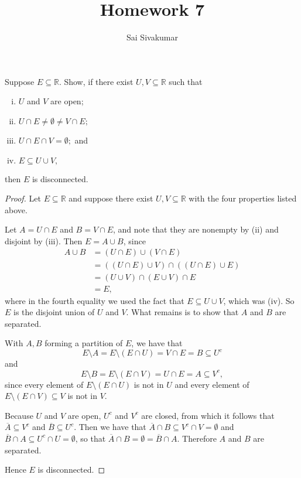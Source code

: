 \documentclass[12pt]{amsart}
\title{Homework 7}
\author{Sai Sivakumar}
\newcommand{\RR}{\mathbb{R}}
\begin{document}
\maketitle

Suppose $E\subseteq \RR.$ Show, if there exist  $U,V\subseteq \RR$ such that
\begin{enumerate}[(i)] 
 \item $U$ and $V$ are open;
 \item $U\cap E\ne \emptyset \ne V\cap E;$ 
 \item $U\cap E\cap V =\emptyset;$ and
 \item $E\subseteq U\cup V,$
\end{enumerate}
 then $E$ is disconnected.


\begin{proof}
Let $E\subseteq \mathbb{R}$ and suppose there exist $U,V\subseteq \mathbb{R}$ with the four properties listed above.

Let $A = U\cap E$ and $B = V\cap E$, and note that they are nonempty by (ii) and disjoint by (iii). Then $E = A\cup B$, since \begin{align*}
    A\cup B &= (U\cap E)\cup (V\cap E)\\
    &= ((U\cap E)\cup V)\cap ((U\cap E)\cup E)\\
    &= (U\cup V) \cap (E\cup V)\cap E\\
    &= E,
\end{align*}
where in the fourth equality we used the fact that $E\subseteq U\cup V$, which was (iv). So $E$ is the disjoint union of $U$ and $V$. What remains is to show that $A$ and $B$ are separated.

With $A,B$ forming a partition of $E$, we have that 
\[E\setminus A = E\setminus (E\cap U) = V\cap E = B \subseteq U^c\] and \[E\setminus B = E\setminus (E\cap V) = U\cap E = A \subseteq V^c,\]
since every element of $E\setminus (E\cap U)$ is not in $U$ and every element of $E\setminus (E\cap V) \subseteq V$ is not in $V$.

Because $U$ and $V$ are open, $U^c$ and $V^c$ are closed, from which it follows that $\overline{A}\subseteq V^c$ and $\overline{B}\subseteq U^c$. Then we have that $\overline{A}\cap B \subseteq V^c\cap V = \emptyset$ and $\overline{B}\cap A \subseteq U^c\cap U = \emptyset$, so that $\overline{A}\cap B = \emptyset = \overline{B}\cap A$. Therefore $A$ and $B$ are separated.

Hence $E$ is disconnected.
\end{proof}
\end{document}
